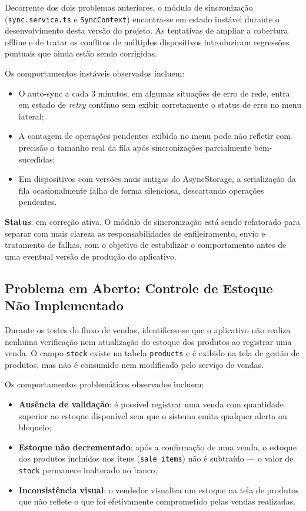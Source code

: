 \documentclass[
	12pt,				%
	oneside,			%
	a4paper,			%
	english,			%
	brazil				%
	]{abntex2}
\begin{document}
Decorrente dos dois problemas anteriores, o módulo de sincronização (\texttt{sync.service.ts} e \texttt{SyncContext}) encontra-se em estado instável durante o desenvolvimento desta versão do projeto. As tentativas de ampliar a cobertura offline e de tratar os conflitos de múltiplos dispositivos introduziram regressões pontuais que ainda estão sendo corrigidas.

Os comportamentos instáveis observados incluem:

\begin{itemize}
  \item O auto-sync a cada 3 minutos, em algumas situações de erro de rede, entra em estado de \textit{retry} contínuo sem exibir corretamente o status de erro no menu lateral;
  \item A contagem de operações pendentes exibida no menu pode não refletir com precisão o tamanho real da fila após sincronizações parcialmente bem-sucedidas;
  \item Em dispositivos com versões mais antigas do AsyncStorage, a serialização da fila ocasionalmente falha de forma silenciosa, descartando operações pendentes.
\end{itemize}

\textbf{Status}: em correção ativa. O módulo de sincronização está sendo refatorado para separar com mais clareza as responsabilidades de enfileiramento, envio e tratamento de falhas, com o objetivo de estabilizar o comportamento antes de uma eventual versão de produção do aplicativo.

\subsection{Problema em Aberto: Controle de Estoque Não Implementado}

Durante os testes do fluxo de vendas, identificou-se que o aplicativo não realiza nenhuma verificação nem atualização do estoque dos produtos ao registrar uma venda. O campo \texttt{stock} existe na tabela \texttt{products} e é exibido na tela de gestão de produtos, mas não é consumido nem modificado pelo serviço de vendas.

Os comportamentos problemáticos observados incluem:

\begin{itemize}
  \item \textbf{Ausência de validação}: é possível registrar uma venda com quantidade superior ao estoque disponível sem que o sistema emita qualquer alerta ou bloqueio;
  \item \textbf{Estoque não decrementado}: após a confirmação de uma venda, o estoque dos produtos incluídos nos itens (\texttt{sale\_items}) não é subtraído — o valor de \texttt{stock} permanece inalterado no banco;
  \item \textbf{Inconsistência visual}: o vendedor visualiza um estoque na tela de produtos que não reflete o que foi efetivamente comprometido pelas vendas realizadas.
\end{itemize}
\end{document}
